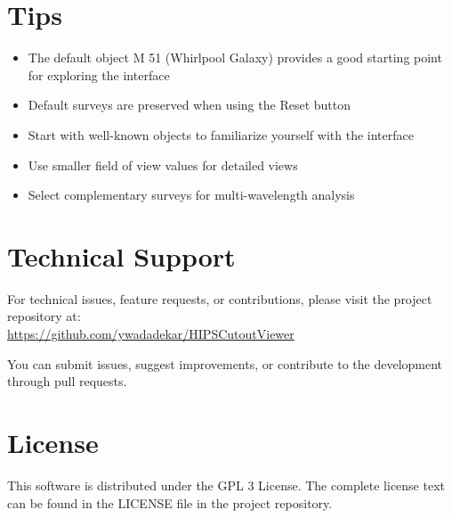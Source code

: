 \documentclass{article}
\begin{document}
\section{Tips}
\begin{itemize}
    \item The default object M 51 (Whirlpool Galaxy) provides a good starting point for exploring the interface
    \item Default surveys are preserved when using the Reset button
    \item Start with well-known objects to familiarize yourself with the interface
    \item Use smaller field of view values for detailed views
    \item Select complementary surveys for multi-wavelength analysis
\end{itemize}

\section{Technical Support}
For technical issues, feature requests, or contributions, please visit the project repository at:\\
\url{https://github.com/ywadadekar/HIPSCutoutViewer}

You can submit issues, suggest improvements, or contribute to the development through pull requests.

\section{License}
This software is distributed under the GPL 3 License. The complete license text can be found in the LICENSE file in the project repository.
\end{document}
